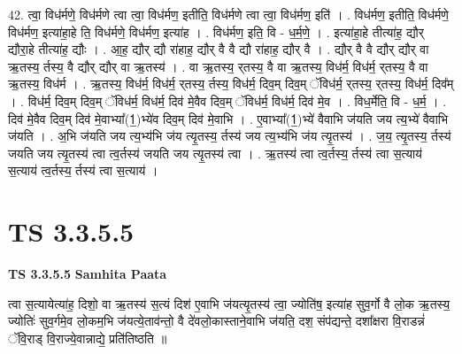 \documentclass[17pt]{extarticle}
\begin{document}
42. त्वा॒ विध॑र्मणे॒ विध॑र्मणे त्वा त्वा॒ विध॑र्मण॒ इतीति॒ विध॑र्मणे त्वा त्वा॒ विध॑र्मण॒ इति॑ । . विध॑र्मण॒ इतीति॒ विध॑र्मणे॒ विध॑र्मण॒ इत्या॑हा॒हे ति॒ विध॑र्मणे॒ विध॑र्मण॒ इत्या॑ह । . विध॑र्मण॒ इति॒ वि - ध॒र्म॒णे॒ । . इत्या॑हा॒हे तीत्या॑ह॒ द्यौर् द्यौरा॒हे तीत्या॑ह॒ द्यौः । . आ॒ह॒ द्यौर् द्यौ रा॑हाह॒ द्यौर् वै वै द्यौ रा॑हाह॒ द्यौर् वै । . द्यौर् वै वै द्यौर् द्यौर् वा ऋ॒तस्य॒ र्तस्य॒ वै द्यौर् द्यौर् वा ऋ॒तस्य॑ । . वा ऋ॒तस्य॒ र्‌तस्य॒ वै वा ऋ॒तस्य॒ विध॑र्म॒ विध॑र्म॒ र्‌तस्य॒ वै वा ऋ॒तस्य॒ विध॑र्म । . ऋ॒तस्य॒ विध॑र्म॒ विध॑र्म॒ र्‌तस्य॒ र्तस्य॒ विध॑र्म॒ दिव॒म् दिव॒म् ॅविध॑र्म॒ र्‌तस्य॒ र्‌तस्य॒ विध॑र्म॒ दिव᳚म् । . विध॑र्म॒ दिव॒म् दिव॒म् ॅविध॑र्म॒ विध॑र्म॒ दिव॑ मे॒वैव दिव॒म् ॅविध॑र्म॒ विध॑र्म॒ दिव॑ मे॒व । . विध॒र्मेति॒ वि - ध॒र्म॒ । . दिव॑ मे॒वैव दिव॒म् दिव॑ मे॒वाभ्या᳚(1॒)भ्ये॑व दिव॒म् दिव॑ मे॒वाभि । . ए॒वाभ्या᳚(1॒)भ्ये॑ वैवाभि ज॑यति जय त्य॒भ्ये॑ वैवाभि ज॑यति । . अ॒भि ज॑यति जय त्य॒भ्य॑भि ज॑य त्यृ॒तस्य॒ र्तस्य॑ जय त्य॒भ्य॑भि ज॑य त्यृ॒तस्य॑ । . ज॒य॒ त्यृ॒तस्य॒ र्तस्य॑ जयति जय त्यृ॒तस्य॑ त्वा त्व॒र्तस्य॑ जयति जय त्यृ॒तस्य॑ त्वा । . ऋ॒तस्य॑ त्वा त्व॒र्तस्य॒ र्तस्य॑ त्वा स॒त्याय॑ स॒त्याय॑ त्व॒र्तस्य॒ र्तस्य॑ त्वा स॒त्याय॑ । \newline
\pagebreak
{}

\section{ TS 3.3.5.5 }

\textbf{TS 3.3.5.5 } \newline
\textbf{Samhita Paata} \newline

त्वा स॒त्यायेत्या॑ह॒ दिशो॒ वा ऋ॒तस्य॑ स॒त्यं दिश॑ ए॒वाभि ज॑यत्यृ॒तस्य॑ त्वा॒ ज्योति॑ष॒ इत्या॑ह सुव॒र्गो वै लो॒क ऋ॒तस्य॒ ज्योतिः॑ सुव॒र्गमे॒व लो॒कम॒भि ज॑यत्ये॒ताव॑न्तो॒ वै दे॑वलो॒कास्ताने॒वाभि ज॑यति॒ दश॒ संप॑द्यन्ते॒ दशा᳚क्षरा वि॒राडन्नं॑ ॅवि॒राड् वि॒राज्ये॒वान्नाद्ये॒ प्रति॑तिष्ठति ॥ \newline
\end{document}
